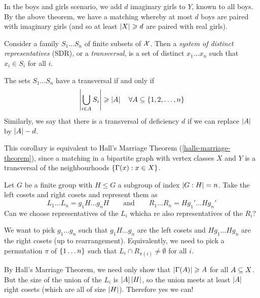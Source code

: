 \documentclass{article}
\begin{document}
\begin{note}
	In the boys and girls scenario, we add $d$ imaginary girls to $Y$, known to all boys. By the above theorem, we have a matching whereby at most $d$ boys are paired with imaginary girls (and so at least $\left\lvert X \right\rvert \geqslant d$ are paired with real girls).
\end{note}

\begin{definition}[Transversal]
    Consider a family $S_1 \dots S_n$ of finite subsets of $\mathcal{X}$. Then a \textit{system of distinct representatives} (SDR), or a \textit{transversal}, is a set of distinct $x_1 \dots x_n$ such that $x_i \in S_i$ for all $i$.
\end{definition}

\begin{corollary}
    The sets $S_1 \dots S_n$ have a transversal if and only if
    \[
	\left\lvert \bigcup_{i \in A} S_i \right\rvert \geqslant \left\lvert A \right\rvert \quad \forall A \subseteq \left\lbrace 1, 2, \dots, n \right\rbrace
	\]
	Similarly, we say that there is a transversal of deficiency $d$ if we can replace $\left\lvert A \right\rvert$ by $\left\lvert A \right\rvert - d$.
\end{corollary}

\begin{note}
	This corollary is equivalent to Hall's Marriage Theorem (\ref{halls-marriage-theorem}), since a matching in a bipartite graph with vertex classes $X$ and $Y$ is a transversal of the neighbourhoods $\left\lbrace \Gamma(x): x \in X \right\rbrace$.
\end{note}

\begin{example}
    Let $G$ be a finite group with $H \leq G$ a subgroup of index $\left\lvert G : H \right\rvert = n$. Take the left cosets and right cosets and represent them as
    \[
	L_1 \dots L_n = g_1 H \dots g_n H \qquad \text{and} \qquad R_1 \dots R_n = H g_1' \dots H g_n'
	\]
	Can we choose representatives of the $L_i$ whicha re also representatives of the $R_i$?
	
	We want to pick $g_1 \dots g_n$ such that $g_1 H \dots g_n$ are the left cosets and $H g_1 \dots H g_n$ are the right cosets (up to rearrangement). Equivalently, we need to pick a permutation $\pi$ of $\left\lbrace 1 \dots n \right\rbrace$ such that $L_i \cap R_{\pi(i)} \neq \emptyset$ for all $i$.
	
	By Hall's Marriage Theorem, we need only show that $\left\lvert \Gamma(A) \right\rvert \geqslant A$ for all $A \subseteq X$. But the size of the union of the $L_i$ is $\left\lvert A \right\rvert\left\lvert H \right\rvert$, so the union meets at least $\left\lvert A \right\rvert$ right cosets (which are all of size $\left\lvert H \right\rvert$). Therefore yes we can!
\end{example}
\end{document}
